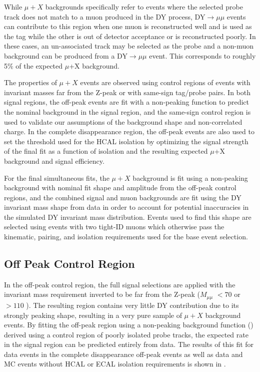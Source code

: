 While $\mu+X$ backgrounds specifically refer to events where the selected probe track does not match to a muon produced in the DY process, DY$\rightarrow\mu\mu$ events can contribute to this region when one muon is reconstructed well and is used as the tag while the other is out of detector acceptance or is reconstructed poorly. 
In these cases, an un-associated track may be selected as the probe and a non-muon background can be produced from a DY$\rightarrow\mu\mu$ event. 
This corresponds to roughly 5$\%$ of the expected $\mu$+X background.

The properties of $\mu+X$ events are observed using control regions of events with invariant masses far from the Z-peak or with same-sign tag/probe pairs.
In both signal regions, the off-peak events are fit with a non-peaking function to predict the nominal background in the signal region, and the same-sign control region is used to validate our assumptions of the background shape and non-correlated charge.
In the complete disappearance region, the off-peak events are also used to set the threshold used for the HCAL isolation by optimizing the signal strength of the final fit as a function of isolation and the resulting expected $\mu$+X background and signal efficiency.

For the final simultaneous fits, the $\mu+X$ background is fit using a non-peaking background with nominal fit shape and amplitude from the off-peak control regions, and the combined signal and muon backgrounds are fit using the DY invariant mass shape from data in order to account for potential inaccuracies in the simulated DY invariant mass distribution.
Events used to find this shape are selected using events with two tight-ID muons which otherwise pass the kinematic, pairing, and isolation requirements used for the base event selection.

\subsection{Off Peak Control Region}
In the off-peak control region, the full signal selections are applied with the invariant mass requirement inverted to be far from the Z-peak ($M_{\mu\mu}$ $<70$ or $>110$ \GeV). 
The resulting region contains very little DY contribution due to its strongly peaking shape, resulting in a very pure sample of $\mu+X$ background events. 
By fitting the off-peak region using a non-peaking background function () derived using a control region of poorly isolated probe tracks, the expected rate in the signal region can be predicted entirely from data. 
The results of this fit for data events in the complete disappearance off-peak events as well as data and MC events without HCAL or ECAL isolation requirements is shown in .

